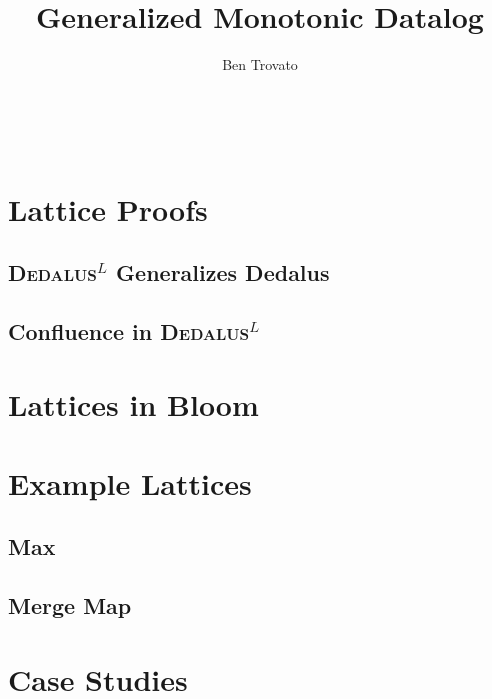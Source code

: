 \documentclass{vldb}
\def\latlang{\textsc{Dedalus}$^L$\xspace}
\begin{document}
\title{Generalized Monotonic Datalog}


\author{
\alignauthor
Ben Trovato\\
       \\
       \\
       \\
}

\maketitle

\begin{abstract}
\end{abstract}



\section{Lattice Proofs}

\subsection{\latlang Generalizes Dedalus}

\subsection{Confluence in \latlang}

\section{Lattices in Bloom}

\section{Example Lattices}

\subsection{Max}

\subsection{Merge Map}

\section{Case Studies}
\end{document}
